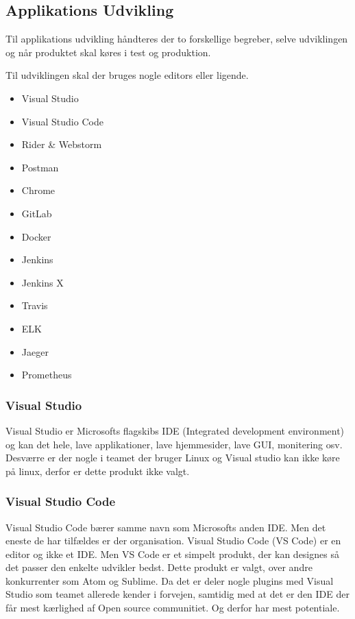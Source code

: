 \subsection{Applikations Udvikling}

Til applikations udvikling håndteres der to forskellige begreber, selve udviklingen og når produktet skal køres i test og produktion.

Til udviklingen skal der bruges nogle editors eller ligende.

\begin{itemize}
    \item Visual Studio
    \item Visual Studio Code
    \item Rider \& Webstorm
    \item Postman
    \item Chrome
    \item GitLab
    \item Docker
    \item Jenkins
    \item Jenkins X
    \item Travis
    \item ELK
    \item Jaeger
    \item Prometheus
\end{itemize}

\subsubsection{Visual Studio}

Visual Studio er Microsofts flagskibs IDE (Integrated development environment) og kan det hele, lave applikationer, lave hjemmesider, lave GUI, monitering osv. Desværre er der nogle i teamet der bruger Linux og Visual studio kan ikke køre på linux, derfor er dette produkt ikke valgt.

\subsubsection{Visual Studio Code}

Visual Studio Code bærer samme navn som Microsofts anden IDE. Men det eneste de har tilfældes er der organisation. Visual Studio Code (VS Code) er en editor og ikke et IDE. Men VS Code er et simpelt produkt, der kan designes så det passer den enkelte udvikler bedst. Dette produkt er valgt, over andre konkurrenter som Atom og Sublime. Da det er deler nogle plugins med Visual Studio som teamet allerede kender i forvejen, samtidig med at det er den IDE der får mest kærlighed af Open source communitiet. Og derfor har mest potentiale.

